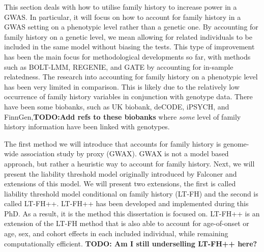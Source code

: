 
This section deals with how to utilise family history to increase power in a GWAS. In particular, it will focus on how to account for family history in a GWAS setting on a phenotypic level rather than a genetic one. By accounting for family history on a genetic level, we mean allowing for related individuals to be included in the same model without biasing the tests. This type of improvement has been the main focus for methodological developments so far, with methods such as BOLT-LMM\cite{loh2015efficient}, REGENIE\cite{mbatchou2021computationally}, and GATE\cite{dey2022efficient} by accounting for in-sample relatedness. The research into accounting for family history on a phenotypic level has been very limited in comparison. This is likely due to the relatively low occurrence of family history variables in conjunction with genotype data. There have been some biobanks, such as UK biobank, deCODE, iPSYCH, and FinnGen,\textbf{TODO:Add refs to these biobanks} where \textit{some} level of family history information have been linked with genotypes. 

The first method we will introduce that accounts for family history is genome-wide association study by proxy (GWAX)\cite{gwax}. GWAX is not a model based approach, but rather a heuristic way to account for family history. Next, we will present the liability threshold model originally introduced by Falconer\cite{falconer1965inheritance} and extensions of this model. We will present two extensions, the first is called liability threshold model conditional on family history (LT-FH)\cite{hujoel2020liability} and the second is called LT-FH++. LT-FH++ has been developed and implemented during this PhD. As a result, it is the method this dissertation is focused on. LT-FH++ is an extension of the LT-FH method that is also able to account for age-of-onset or age, sex, and cohort effects in each included individual, while remaining computationally efficient. \textbf{TODO: Am I still underselling LT-FH++ here?}

